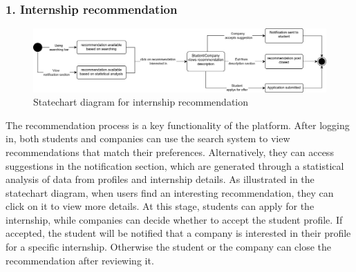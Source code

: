 \subsubsection{1. Internship recommendation}\label{subsubsec:internship_application}
\begin{figure}[H]
    \centering
    \includegraphics[width=1\textwidth]{Images/Statecharts/Internship_recommendation.png}
    \caption{Statechart diagram for internship recommendation}\label{fig:statechart_internship_recommendation}
\end{figure}
The recommendation process is a key functionality of the platform. After logging in, both students and companies can use the search system to view 
recommendations that match their preferences. Alternatively, they can access suggestions in the notification section, which are generated through
a statistical analysis of data from profiles and internship details. As illustrated in the statechart diagram, when users find an interesting 
recommendation, they can click on it to view more details. At this stage, students can apply for the internship, while companies can decide whether
to accept the student profile. If accepted, the student will be notified that a company is interested in their profile for a specific internship. 
Otherwise the student or the company can close the recommendation after reviewing it.


